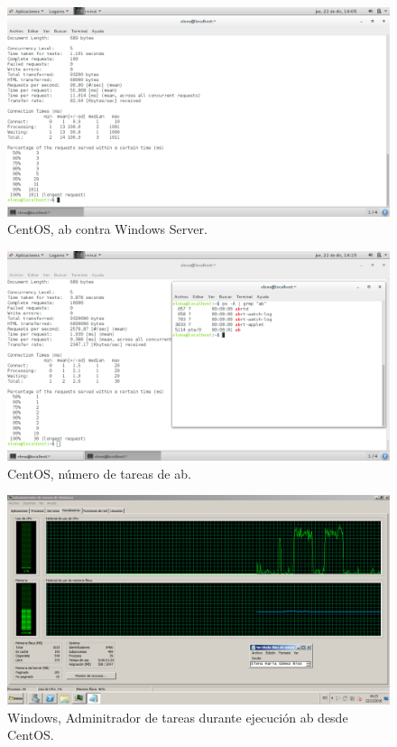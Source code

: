 \begin{figure}[H] 
	\centering
	\includegraphics[width=14.7cm]{./img/ejercicio2_2.png} 	
	\caption{CentOS, ab contra Windows Server.} \label{fig:ejercicio2_2}
\end{figure}

\begin{figure}[H] 
	\centering
	\includegraphics[width=14.7cm]{./img/ejercicio2_3.png} 	
	\caption{CentOS, número de tareas de ab.} \label{fig:ejercicio2_3}
\end{figure}

\begin{figure}[H] 
	\centering
	\includegraphics[width=14.7cm]{./img/ejercicio2_4.png} 	
	\caption{Windows, Adminitrador de tareas durante ejecución ab desde CentOS.} \label{fig:ejercicio2_4}
\end{figure}


